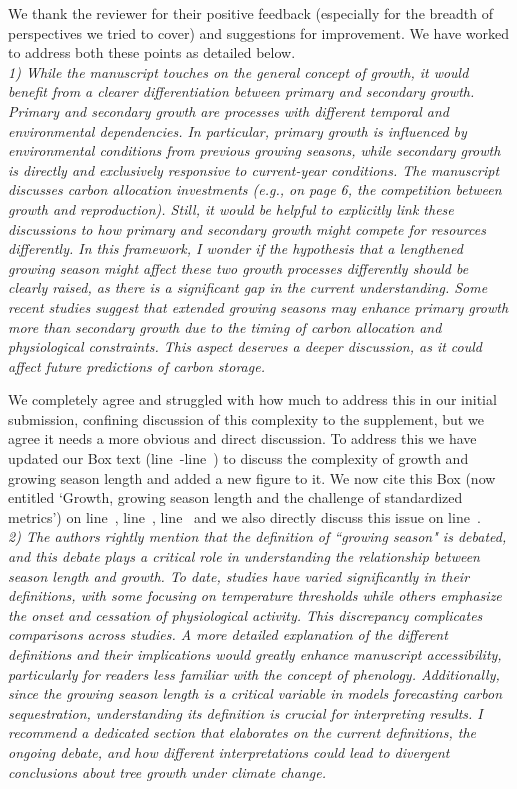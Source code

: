 \documentclass[11pt]{article}
\newcommand{\lr}[1]{line~\lineref{#1}}
\begin{document}
We thank the reviewer for their positive feedback (especially for the breadth of perspectives we tried to cover) and suggestions for improvement. We have worked to address both these points as detailed below.\\

\emph{1) While the manuscript touches on the general concept of growth, it would benefit from a clearer differentiation between primary and secondary growth. Primary and secondary growth are processes with different temporal and environmental dependencies. In particular, primary growth is influenced by environmental conditions from previous growing seasons, while secondary growth is directly and exclusively responsive to current-year conditions. The manuscript discusses carbon allocation investments (e.g., on page 6, the competition between growth and reproduction). Still, it would be helpful to explicitly link these discussions to how primary and secondary growth might compete for resources differently. In this framework, I wonder if the hypothesis that a lengthened growing season might affect these two growth processes differently should be clearly raised, as there is a significant gap in the current understanding. Some recent studies suggest that extended growing seasons may enhance primary growth more than secondary growth due to the timing of carbon allocation and physiological constraints. This aspect deserves a deeper discussion, as it could affect future predictions of carbon storage.}

We completely agree and struggled with how much to address this in our initial submission, confining discussion of this complexity to the supplement, but we agree it needs a more obvious and direct discussion. To address this we have updated our Box text (\lr{startbox}-\lr{endbox}) to discuss the complexity of growth and growing season length and added a new figure to it. We now cite this Box (now entitled `Growth, growing season length and the challenge of standardized metrics') on \lr{R1box0}, \lr{R1box1}, \lr{R1box2} and we also directly discuss this issue on \lr{R1growth}. \\


\emph{2) The authors rightly mention that the definition of ``growing season" is debated, and this debate plays a critical role in understanding the relationship between season length and growth. To date, studies have varied significantly in their definitions, with some focusing on temperature thresholds while others emphasize the onset and cessation of physiological activity. This discrepancy complicates comparisons across studies. A more detailed explanation of the different definitions and their implications would greatly enhance manuscript accessibility, particularly for readers less familiar with the concept of phenology. Additionally, since the growing season length is a critical variable in models forecasting carbon sequestration, understanding its definition is crucial for interpreting results. I recommend a dedicated section that elaborates on the current definitions, the ongoing debate, and how different interpretations could lead to divergent conclusions about tree growth under climate change.}
\end{document}
